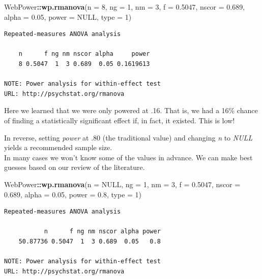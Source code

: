 \documentclass[
  11pt,
]{book}
\newenvironment{Shaded}{\begin{snugshade}}{\end{snugshade}}
\newcommand{\AttributeTok}[1]{\textcolor[rgb]{0.27,0.27,0.27}{#1}}
\newcommand{\ConstantTok}[1]{\textcolor[rgb]{0.37,0.37,0.37}{#1}}
\newcommand{\DecValTok}[1]{\textcolor[rgb]{0.06,0.06,0.06}{#1}}
\newcommand{\FloatTok}[1]{\textcolor[rgb]{0.06,0.06,0.06}{#1}}
\newcommand{\FunctionTok}[1]{\textcolor[rgb]{0.27,0.27,0.27}{\textbf{#1}}}
\newcommand{\NormalTok}[1]{#1}
\newcommand{\SpecialCharTok}[1]{\textcolor[rgb]{0.43,0.43,0.43}{\textbf{#1}}}
\begin{document}
\begin{Shaded}
\begin{Highlighting}[]
\NormalTok{WebPower}\SpecialCharTok{::}\FunctionTok{wp.rmanova}\NormalTok{(}\AttributeTok{n =} \DecValTok{8}\NormalTok{, }\AttributeTok{ng =} \DecValTok{1}\NormalTok{, }\AttributeTok{nm =} \DecValTok{3}\NormalTok{, }\AttributeTok{f =} \FloatTok{0.5047}\NormalTok{, }\AttributeTok{nscor =} \FloatTok{0.689}\NormalTok{,}
    \AttributeTok{alpha =} \FloatTok{0.05}\NormalTok{, }\AttributeTok{power =} \ConstantTok{NULL}\NormalTok{, }\AttributeTok{type =} \DecValTok{1}\NormalTok{)}
\end{Highlighting}
\end{Shaded}

\begin{verbatim}
Repeated-measures ANOVA analysis

    n      f ng nm nscor alpha     power
    8 0.5047  1  3 0.689  0.05 0.1619613

NOTE: Power analysis for within-effect test
URL: http://psychstat.org/rmanova
\end{verbatim}

Here we learned that we were only powered at .16. That is, we had a 16\% chance of finding a statistically significant effect if, in fact, it existed. This is low!

In reverse, setting \emph{power} at .80 (the traditional value) and changing \emph{n} to \emph{NULL} yields a recommended sample size.\\
In many cases we won't know some of the values in advance. We can make best guesses based on our review of the literature.

\begin{Shaded}
\begin{Highlighting}[]
\NormalTok{WebPower}\SpecialCharTok{::}\FunctionTok{wp.rmanova}\NormalTok{(}\AttributeTok{n =} \ConstantTok{NULL}\NormalTok{, }\AttributeTok{ng =} \DecValTok{1}\NormalTok{, }\AttributeTok{nm =} \DecValTok{3}\NormalTok{, }\AttributeTok{f =} \FloatTok{0.5047}\NormalTok{, }\AttributeTok{nscor =} \FloatTok{0.689}\NormalTok{,}
    \AttributeTok{alpha =} \FloatTok{0.05}\NormalTok{, }\AttributeTok{power =} \FloatTok{0.8}\NormalTok{, }\AttributeTok{type =} \DecValTok{1}\NormalTok{)}
\end{Highlighting}
\end{Shaded}

\begin{verbatim}
Repeated-measures ANOVA analysis

           n      f ng nm nscor alpha power
    50.87736 0.5047  1  3 0.689  0.05   0.8

NOTE: Power analysis for within-effect test
URL: http://psychstat.org/rmanova
\end{verbatim}
\end{document}
